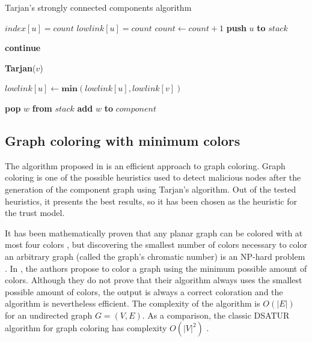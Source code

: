 \documentclass[conference]{IEEEtran}
\begin{document}
\begin{algorithm}
\caption{Tarjan's strongly connected components algorithm}\label{algorithm:tarjan}
\begin{algorithmic}[1]


\State $index[u] = count$
\State $lowlink[u] = count$
\State $count \gets count + 1$
\State \textbf{push} $u$ \textbf{to} $stack$

		\State \textbf{continue}
	\EndIf	
		
		\State \textbf{Tarjan}($v$)
	\EndIf
	
	\State $lowlink[u] \gets \textbf{min}(lowlink[u],lowlink[v])$
\EndFor

	\Repeat
		\State \textbf{pop} $w$ \textbf{from} $stack$
		\State \textbf{add} $w$ \textbf{to} $component$
\EndIf

\EndFunction
\end{algorithmic}
\end{algorithm}

\subsection{Graph coloring with minimum colors}
\label{section:coloring}
The algorithm proposed in \cite{mittal2011graph} is an efficient approach to graph coloring.
Graph coloring is one of the possible heuristics used to detect malicious nodes after the generation of the component graph using Tarjan's algorithm.
Out of the tested heuristics, it presents the best results, so it has been chosen as the heuristic for the trust model.

It has been mathematically proven that any planar graph can be colored with at most four colors \cite{appel1976every}, but discovering the smallest number of colors necessary to color an arbitrary graph (called the graph's chromatic number) is an NP-hard problem \cite{sanchez1989determining}.
In \cite{mittal2011graph}, the authors propose to color a graph using the minimum possible amount of colors.
Although they do not prove that their algorithm always uses the smallest possible amount of colors, the output is always a correct coloration and the algorithm is nevertheless efficient.
The complexity of the algorithm is $O(|E|)$ for an undirected graph $G = (V,E)$.
As a comparison, the classic DSATUR algorithm for graph coloring has complexity $O(|V|^2)$ \cite{brelaz1979new}.
\end{document}
